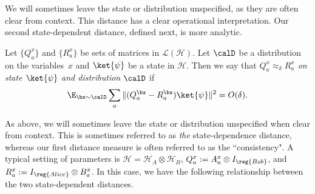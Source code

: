 We will sometimes leave the state or distribution unspecified, as they are often clear from context.
This distance has a clear operational interpretation.
Our second state-dependent distance,
defined next,
is more analytic.

\begin{definition}
Let $\{Q^x_a\}$ and $\{R^x_a\}$ be sets of matrices in $\mathcal{L}(\mathcal{H})$.
Let $\calD$ be a distribution on the variables~$x$ and $\ket{\psi}$ be a state in $\mathcal{H}$.
Then we say that \emph{$Q^x_a \approx_{\delta} R^x_a$ on state $\ket{\psi}$ and distribution $\calD$} if
\begin{equation*}
\E_{\bx \sim \calD} \sum_a \Vert (Q_{a}^{\bx} - R_{a}^{\bx} ) \ket{\psi}\Vert^2 = O(\delta).
\end{equation*}
\end{definition}

As above, we will sometimes leave the state or distribution unspecified when clear from context.
This is sometimes referred to as \emph{the} state-dependence distance,
whereas our first distance measure is often referred to as the ``consistency".
A typical setting of parameters is $\mathcal{H} = \mathcal{H}_A \otimes \mathcal{H}_B$,
$Q^x_a := A^x_a \otimes I_{\reg{Bob}}$,
and $R^x_a := I_{\reg{Alice}} \otimes B^x_a$.
In this case, we have the following relationship between the two state-dependent distances.


